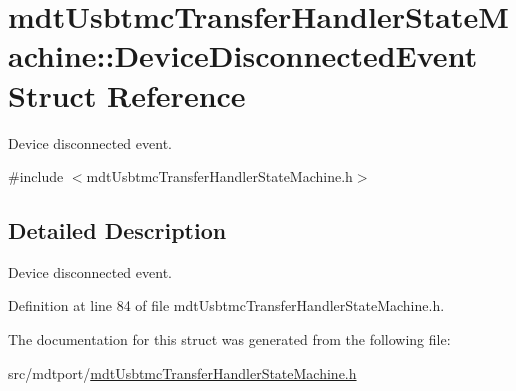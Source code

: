 \hypertarget{structmdt_usbtmc_transfer_handler_state_machine_1_1_device_disconnected_event}{\section{mdt\-Usbtmc\-Transfer\-Handler\-State\-Machine\-:\-:Device\-Disconnected\-Event Struct Reference}
\label{structmdt_usbtmc_transfer_handler_state_machine_1_1_device_disconnected_event}
}


Device disconnected event.  




{\ttfamily \#include $<$mdt\-Usbtmc\-Transfer\-Handler\-State\-Machine.\-h$>$}



\subsection{Detailed Description}
Device disconnected event. 

Definition at line 84 of file mdt\-Usbtmc\-Transfer\-Handler\-State\-Machine.\-h.



The documentation for this struct was generated from the following file\-:\begin{DoxyCompactItemize}
\item 
src/mdtport/\hyperlink{mdt_usbtmc_transfer_handler_state_machine_8h}{mdt\-Usbtmc\-Transfer\-Handler\-State\-Machine.\-h}\end{DoxyCompactItemize}
